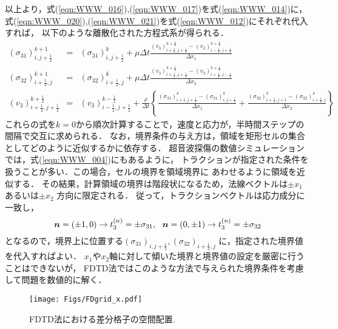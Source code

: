 以上より，式(\ref{eqn:WWW_016}),(\ref{eqn:WWW_017})を式(\ref{eqn:WWW_014})に，
式(\ref{eqn:WWW_020}),(\ref{eqn:WWW_021})を式(\ref{eqn:WWW_012})にそれぞれ代入すれば，
以下のような離散化された方程式系が得られる．
\begin{eqnarray}
	(\sigma_{31})^{k+1}_{i,j+\frac{1}{2}} &=& 
	(\sigma_{31})^{k} _{i,j+\frac{1}{2}}
	+
	\mu \Delta t 
	\frac{
		(v_3)_{i+\frac{1}{2},j+\frac{1}{2}}^{k+\frac{1}{2}}
		-
		(v_3)_{i-\frac{1}{2},j+\frac{1}{2}}^{k+\frac{1}{2}} 
	}{\Delta x_1}
	\label{eqn:WWW_022}
	\\
	(\sigma_{32})^{k+1}_{i+\frac{1}{2},j} &=& 
	(\sigma_{32})^{k}_{i+\frac{1}{2},j} 
	+
	\mu \Delta t 
	\frac{
		(v_3)_{i+\frac{1}{2},j+\frac{1}{2}}^{k+\frac{1}{2}} 
		-
		(v_3)_{i+\frac{1}{2},j-\frac{1}{2}}^{k+\frac{1}{2}} 
	}{\Delta x_2}
	\label{eqn:WWW_023}
	\\
	(v_3)_{i+\frac{1}{2},j+\frac{1}{2}}^{k+\frac{1}{2}} 
	&=& 
	(v_3)_{i-\frac{1}{2},j+\frac{1}{2}}^{k-\frac{1}{2}} 
	+
	\frac{\rho}{\Delta t} \left\{
		\frac{(\sigma_{31})^k_{i+1,j+\frac{1}{2}} - (\sigma_{31})^k_{i,j+\frac{1}{2}} }{\Delta x_1}
		+
		\frac{(\sigma_{32})^k_{i+\frac{1}{2},j+1} - (\sigma_{32})^k_{i+\frac{1}{2},j} }{\Delta x_2}
	\right\} 
	\label{eqn:WWW_024}
\end{eqnarray}
これらの式を$k=0$から順次計算することで，速度と応力が，半時間ステップの間隔で交互に求められる．
なお，境界条件の与え方は，領域を矩形セルの集合としてどのように近似するかに依存する．
超音波探傷の数値シミュレーションでは，式(\ref{eqn:WWW_004})にもあるように，
トラクションが指定された条件を扱うことが多い．この場合，セルの境界を領域境界に
あわせるように領域を近似する．
その結果，計算領域の境界は階段状になるため，法線ベクトルは$\pm x_1$あるいは$\pm x_2$
方向に限定される．
従って，トラクションベクトルは応力成分に一致し，
\[
	\fat{n}=(\pm 1, 0) \rightarrow t_3^{(n)}=\pm \sigma_{31}, \ \ 
	\fat{n}=(0, \pm1 ) \rightarrow t_3^{(n)}=\pm \sigma_{32}
	\label{eqn:}
\]
となるので，境界上に位置する$(\sigma_{31})_{i,j+\frac{1}{2}},(\sigma_{32})_{i+\frac{1}{2},j}$
に，指定された境界値を代入すればよい．
$x_1$や$x_2$軸に対して傾いた境界と境界値の設定を厳密に行うことはできないが，
FDTD法ではこのような方法で与えられた境界条件を考慮して問題を数値的に解く．
\begin{figure}[h]
	\begin{center}
	\texttt{[image: Figs/FDgrid\_x.pdf]} 
	\end{center}
	\caption{FDTD法における差分格子の空間配置.} 
	\label{fig:staggered}
\end{figure}
